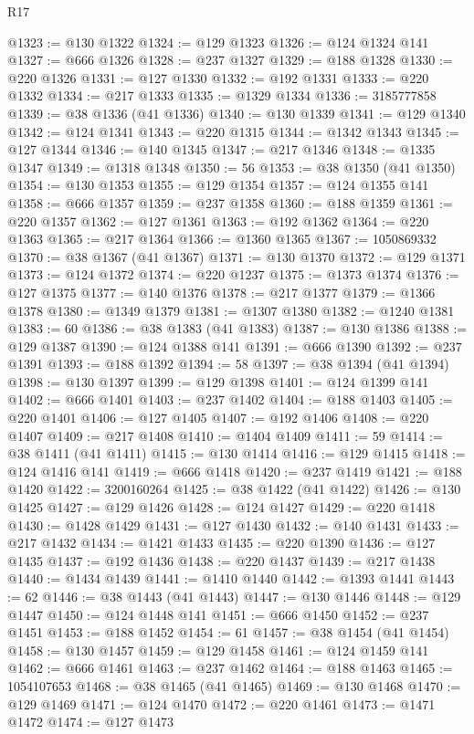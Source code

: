 \begin{lexlean}{R17}
\begin{coremodule}
@1323 := @130 @1322
@1324 := @129 @1323
@1326 := @124 @1324 @141
@1327 := @666 @1326
@1328 := @237 @1327
@1329 := @188 @1328
@1330 := @220 @1326
@1331 := @127 @1330
@1332 := @192 @1331
@1333 := @220 @1332
@1334 := @217 @1333
@1335 := @1329 @1334
@1336 := 3185777858
@1339 := @38 @1336 (@41 @1336)
@1340 := @130 @1339
@1341 := @129 @1340
@1342 := @124 @1341
@1343 := @220 @1315
@1344 := @1342 @1343
@1345 := @127 @1344
@1346 := @140 @1345
@1347 := @217 @1346
@1348 := @1335 @1347
@1349 := @1318 @1348
@1350 := 56
@1353 := @38 @1350 (@41 @1350)
@1354 := @130 @1353
@1355 := @129 @1354
@1357 := @124 @1355 @141
@1358 := @666 @1357
@1359 := @237 @1358
@1360 := @188 @1359
@1361 := @220 @1357
@1362 := @127 @1361
@1363 := @192 @1362
@1364 := @220 @1363
@1365 := @217 @1364
@1366 := @1360 @1365
@1367 := 1050869332
@1370 := @38 @1367 (@41 @1367)
@1371 := @130 @1370
@1372 := @129 @1371
@1373 := @124 @1372
@1374 := @220 @1237
@1375 := @1373 @1374
@1376 := @127 @1375
@1377 := @140 @1376
@1378 := @217 @1377
@1379 := @1366 @1378
@1380 := @1349 @1379
@1381 := @1307 @1380
@1382 := @1240 @1381
@1383 := 60
@1386 := @38 @1383 (@41 @1383)
@1387 := @130 @1386
@1388 := @129 @1387
@1390 := @124 @1388 @141
@1391 := @666 @1390
@1392 := @237 @1391
@1393 := @188 @1392
@1394 := 58
@1397 := @38 @1394 (@41 @1394)
@1398 := @130 @1397
@1399 := @129 @1398
@1401 := @124 @1399 @141
@1402 := @666 @1401
@1403 := @237 @1402
@1404 := @188 @1403
@1405 := @220 @1401
@1406 := @127 @1405
@1407 := @192 @1406
@1408 := @220 @1407
@1409 := @217 @1408
@1410 := @1404 @1409
@1411 := 59
@1414 := @38 @1411 (@41 @1411)
@1415 := @130 @1414
@1416 := @129 @1415
@1418 := @124 @1416 @141
@1419 := @666 @1418
@1420 := @237 @1419
@1421 := @188 @1420
@1422 := 3200160264
@1425 := @38 @1422 (@41 @1422)
@1426 := @130 @1425
@1427 := @129 @1426
@1428 := @124 @1427
@1429 := @220 @1418
@1430 := @1428 @1429
@1431 := @127 @1430
@1432 := @140 @1431
@1433 := @217 @1432
@1434 := @1421 @1433
@1435 := @220 @1390
@1436 := @127 @1435
@1437 := @192 @1436
@1438 := @220 @1437
@1439 := @217 @1438
@1440 := @1434 @1439
@1441 := @1410 @1440
@1442 := @1393 @1441
@1443 := 62
@1446 := @38 @1443 (@41 @1443)
@1447 := @130 @1446
@1448 := @129 @1447
@1450 := @124 @1448 @141
@1451 := @666 @1450
@1452 := @237 @1451
@1453 := @188 @1452
@1454 := 61
@1457 := @38 @1454 (@41 @1454)
@1458 := @130 @1457
@1459 := @129 @1458
@1461 := @124 @1459 @141
@1462 := @666 @1461
@1463 := @237 @1462
@1464 := @188 @1463
@1465 := 1054107653
@1468 := @38 @1465 (@41 @1465)
@1469 := @130 @1468
@1470 := @129 @1469
@1471 := @124 @1470
@1472 := @220 @1461
@1473 := @1471 @1472
@1474 := @127 @1473

\end{coremodule}
\end{lexlean}
